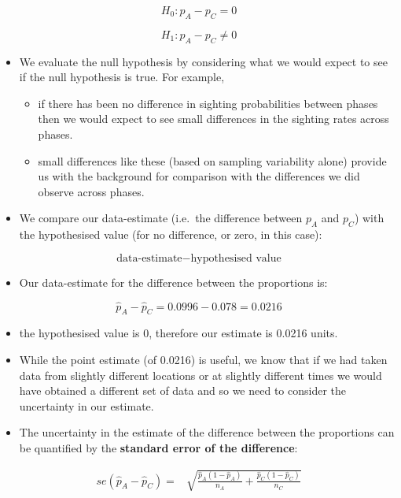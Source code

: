 \documentclass[
  oneside]{krantz}
\providecommand{\tightlist}{%
  \setlength{\itemsep}{0pt}\setlength{\parskip}{0pt}}
\begin{document}
\[H_0: p_{A}-p_{C}=0\]

\[H_1: p_{A}-p_{C} \neq 0\]

\begin{itemize}
\item
  We evaluate the null hypothesis by considering what we would expect to see if the null hypothesis is true. For example,

  \begin{itemize}
  \tightlist
  \item
    if there has been no difference in sighting probabilities between phases then we would expect to see small differences in the sighting rates across phases.
  \item
    small differences like these (based on sampling variability alone) provide us with the background for comparison with the differences we did observe across phases.
  \end{itemize}
\item
  We compare our data-estimate (i.e.~the difference between \(p_{A}\) and \(p_{C}\)) with the hypothesised value (for no difference, or zero, in this case):
\end{itemize}

\[\textrm{data-estimate} - \textrm{hypothesised value}\]

\begin{itemize}
\tightlist
\item
  Our data-estimate for the difference between the proportions is:
\end{itemize}

\begin{center}
$$\hat{p}_{A}-\hat{p}_{C}= 0.0996 - 0.078 = 0.0216 $$
\end{center}

\begin{itemize}
\item
  the hypothesised value is 0, therefore our estimate is 0.0216 units.
\item
  While the point estimate (of 0.0216) is useful, we know that if we had taken data from slightly different locations or at slightly different times we would have obtained a different set of data and so we need to consider the uncertainty in our estimate.
\item
  The uncertainty in the estimate of the difference between the proportions can be quantified by the \textbf{standard error of the difference}:
\end{itemize}

\begin{align*}
se(\hat{p}_A-\hat{p}_C)=&\sqrt{\frac{\hat{p}_A(1-\hat{p}_A)}{n_A}+\frac{\hat{p}_C(1-\hat{p}_C)}{n_C}}\\
\end{align*}
\end{document}
